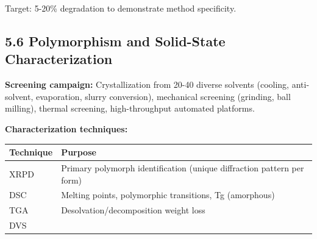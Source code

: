 \documentclass[
  11pt,
  a4paper,
]{report}
\begin{document}
Target: 5-20\% degradation to demonstrate method specificity.

\hypertarget{polymorphism-and-solid-state-characterization}{%
\subsection{5.6 Polymorphism and Solid-State
Characterization}\label{polymorphism-and-solid-state-characterization}}

\textbf{Screening campaign:} Crystallization from 20-40 diverse solvents
(cooling, anti-solvent, evaporation, slurry conversion), mechanical
screening (grinding, ball milling), thermal screening, high-throughput
automated platforms.

\textbf{Characterization techniques:}

\begin{longtable}[]{@{}ll@{}}
\toprule
\begin{minipage}[b]{0.52\columnwidth}\raggedright
Technique\strut
\end{minipage} & \begin{minipage}[b]{0.42\columnwidth}\raggedright
Purpose\strut
\end{minipage}\tabularnewline
\midrule
\endhead
\begin{minipage}[t]{0.52\columnwidth}\raggedright
XRPD\strut
\end{minipage} & \begin{minipage}[t]{0.42\columnwidth}\raggedright
Primary polymorph identification (unique diffraction pattern per
form)\strut
\end{minipage}\tabularnewline
\begin{minipage}[t]{0.52\columnwidth}\raggedright
DSC\strut
\end{minipage} & \begin{minipage}[t]{0.42\columnwidth}\raggedright
Melting points, polymorphic transitions, Tg (amorphous)\strut
\end{minipage}\tabularnewline
\begin{minipage}[t]{0.52\columnwidth}\raggedright
TGA\strut
\end{minipage} & \begin{minipage}[t]{0.42\columnwidth}\raggedright
Desolvation/decomposition weight loss\strut
\end{minipage}\tabularnewline
\begin{minipage}[t]{0.52\columnwidth}\raggedright
DVS\strut
\end{minipage} & \begin{minipage}[t]{0.42\columnwidth}\raggedright

\end{minipage}
\end{longtable}
\end{document}
